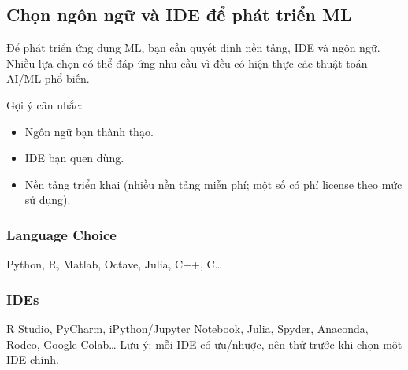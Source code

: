 \subsection{Chọn ngôn ngữ và IDE để phát triển ML}

\begin{dongco}[title={Chọn công cụ theo năng lực và bối cảnh}]
Để phát triển ứng dụng ML, bạn cần quyết định nền tảng, IDE và ngôn ngữ.
Nhiều lựa chọn có thể đáp ứng nhu cầu vì đều có hiện thực các thuật toán AI/ML phổ biến.
\end{dongco}

\begin{phuongphap}[title={Nếu tự phát triển thuật toán}]
Gợi ý cân nhắc:
\begin{itemize}
  \item Ngôn ngữ bạn thành thạo.
  \item IDE bạn quen dùng.
  \item Nền tảng triển khai (nhiều nền tảng miễn phí; một số có phí license theo mức sử dụng).
\end{itemize}
\end{phuongphap}

\subsubsection{Language Choice}
\begin{phuongphap}[title={Ngôn ngữ hỗ trợ ML}]
Python, R, Matlab, Octave, Julia, C++, C\ldots
\end{phuongphap}

\subsubsection{IDEs}
\begin{phuongphap}[title={IDE hỗ trợ ML}]
R Studio, PyCharm, iPython/Jupyter Notebook, Julia, Spyder, Anaconda, Rodeo, Google Colab\ldots
Lưu ý: mỗi IDE có ưu/nhược, nên thử trước khi chọn một IDE chính.
\end{phuongphap}
